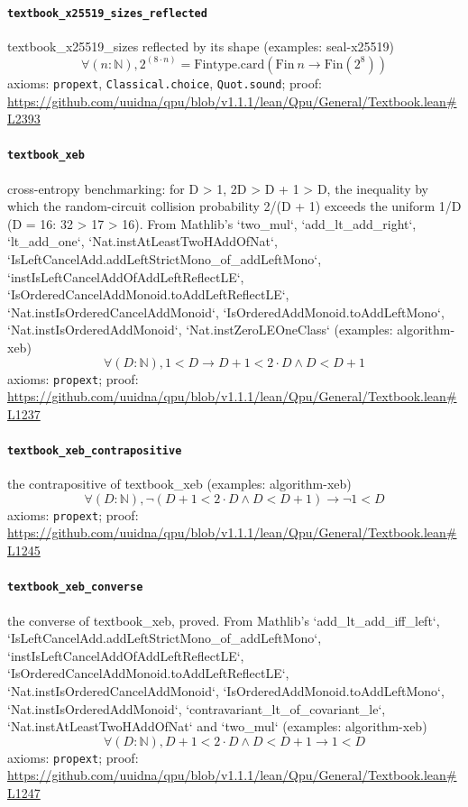 \documentclass[11pt]{article}
\begin{document}
\paragraph{\texttt{textbook\_x25519\_sizes\_reflected}}
textbook\_x25519\_sizes reflected by its shape (examples: seal-x25519)
\[ \forall (n : \mathbb{N}), 2 ^{(8 \cdot n)} = \mathrm{Fintype.card} (\mathrm{Fin}\ n \to \mathrm{Fin} (2 ^{8})) \]
\noindent axioms: \texttt{propext}, \texttt{Classical.choice}, \texttt{Quot.sound}; proof: \url{https://github.com/uuidna/qpu/blob/v1.1.1/lean/Qpu/General/Textbook.lean\#L2393}

\paragraph{\texttt{textbook\_xeb}}
cross-entropy benchmarking: for D > 1, 2D > D + 1 > D, the inequality by which the random-circuit collision probability 2/(D + 1) exceeds the uniform 1/D (D = 16: 32 > 17 > 16). From Mathlib's `two\_mul`, `add\_lt\_add\_right`, `lt\_add\_one`, `Nat.instAtLeastTwoHAddOfNat`, `IsLeftCancelAdd.addLeftStrictMono\_of\_addLeftMono`, `instIsLeftCancelAddOfAddLeftReflectLE`, `IsOrderedCancelAddMonoid.toAddLeftReflectLE`, `Nat.instIsOrderedCancelAddMonoid`, `IsOrderedAddMonoid.toAddLeftMono`, `Nat.instIsOrderedAddMonoid`, `Nat.instZeroLEOneClass` (examples: algorithm-xeb)
\[ \forall (D : \mathbb{N}), 1 < D \to D + 1 < 2 \cdot D \land D < D + 1 \]
\noindent axioms: \texttt{propext}; proof: \url{https://github.com/uuidna/qpu/blob/v1.1.1/lean/Qpu/General/Textbook.lean\#L1237}

\paragraph{\texttt{textbook\_xeb\_contrapositive}}
the contrapositive of textbook\_xeb (examples: algorithm-xeb)
\[ \forall (D : \mathbb{N}), \neg (D + 1 < 2 \cdot D \land D < D + 1) \to \neg 1 < D \]
\noindent axioms: \texttt{propext}; proof: \url{https://github.com/uuidna/qpu/blob/v1.1.1/lean/Qpu/General/Textbook.lean\#L1245}

\paragraph{\texttt{textbook\_xeb\_converse}}
the converse of textbook\_xeb, proved. From Mathlib's `add\_lt\_add\_iff\_left`, `IsLeftCancelAdd.addLeftStrictMono\_of\_addLeftMono`, `instIsLeftCancelAddOfAddLeftReflectLE`, `IsOrderedCancelAddMonoid.toAddLeftReflectLE`, `Nat.instIsOrderedCancelAddMonoid`, `IsOrderedAddMonoid.toAddLeftMono`, `Nat.instIsOrderedAddMonoid`, `contravariant\_lt\_of\_covariant\_le`, `Nat.instAtLeastTwoHAddOfNat` and `two\_mul` (examples: algorithm-xeb)
\[ \forall (D : \mathbb{N}), D + 1 < 2 \cdot D \land D < D + 1 \to 1 < D \]
\noindent axioms: \texttt{propext}; proof: \url{https://github.com/uuidna/qpu/blob/v1.1.1/lean/Qpu/General/Textbook.lean\#L1247}
\end{document}
